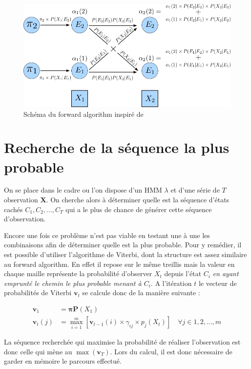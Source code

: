 \documentclass[12pt, french]{report}
\begin{document}
\begin{figure}[ht]
	\begin{center}
		\includegraphics[width= 0.8 \textwidth]{Images/Models/HMM/Forward.png}
		\caption{Schéma du forward algorithm inspiré de \cite{jurafsky_speech_2017} }
		\label{fig::HMM:ForwardAlgo}
	\end{center}
\end{figure}
		
\section{Recherche de la séquence la plus probable}
On se place dans le cadre ou l'on dispose d'un HMM $\lambda$ et d'une série de $T$ observation $\bm{X}$. On cherche alors à déterminer quelle est la séquence d'états cachés $C_1,C_2,...,C_T$ qui a le plus de chance de générer cette séquence d'observation.

Encore une fois ce problème n'est pas viable en testant une à une les combinaisons afin de déterminer quelle est la plus probable. Pour y remédier, il est possible d'utiliser l'algorithme de Viterbi, dont la structure est assez similaire au forward algorithm. En effet il repose sur le même treillis mais la valeur en chaque maille représente la probabilité d'observer $X_t$ depuis l'état $C_i$ \textit{en ayant emprunté le chemin le plus probable menant à $C_i$}. A l'itération $t$ le vecteur de probabilités de Viterbi $\bm{v}_t$ se calcule donc de la manière suivante :

\begin{align} 
\label{eq::HMM:ViterbiAlgo}
\bm{v}_1 &= \bm{\pi} \bm{P}(X_1) \\ 
\bm{v}_t(j) &= \max\limits_{i=1}^m \left[ \bm{v}_{t-1}(i) \times \gamma_{ij} \times  p_j(X_t) \right] \quad \forall j \in 1,2,...,m
\end{align}

La séquence recherchée qui maximise la probabilité de réaliser l'observation est donc celle qui mène au $\max\left(\bm{v}_T\right)$. Lors du calcul, il est donc nécessaire de garder en mémoire le parcours effectué.
\end{document}
